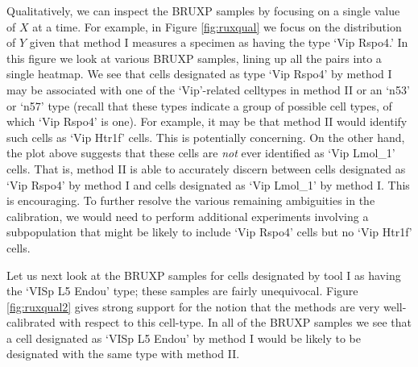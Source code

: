 
Qualitatively, we can inspect the BRUXP samples by focusing on a single value of $X$ at a time.  For example, in Figure \ref{fig:ruxqual} we focus on the distribution of $Y$ given that method I measures a specimen as having the type `Vip Rspo4.'   In this figure we look at various BRUXP samples, lining up all the pairs into a single heatmap.   We see that cells designated as type `Vip Rspo4' by method I may be associated with one of the `Vip'-related celltypes in method II or an `n53' or `n57' type (recall that these types indicate a group of possible cell types, of which `Vip Rspo4' is one).  For example, it may be that method II would identify such cells as `Vip Htr1f' cells.  This is potentially concerning.  On the other hand, the plot above suggests that these cells are \emph{not} ever identified as `Vip Lmol\_1' cells.  That is, method II is able to accurately discern between cells designated as `Vip Rspo4' by method I and cells designated as `Vip Lmol\_1' by method I.  This is encouraging. To further resolve the various remaining ambiguities in the calibration, we would need to perform additional experiments involving a subpopulation that might be likely to include `Vip Rspo4' cells but no `Vip Htr1f' cells.

Let us next look at the BRUXP samples for cells designated by tool I as having the `VISp L5 Endou' type; these samples are fairly unequivocal.  Figure \ref{fig:ruxqual2} gives strong support for the notion that the methods are very well-calibrated with respect to this cell-type.  In all of the BRUXP samples we see that a cell designated as `VISp L5 Endou' by method I would be likely to be designated with the same type with method II.  


